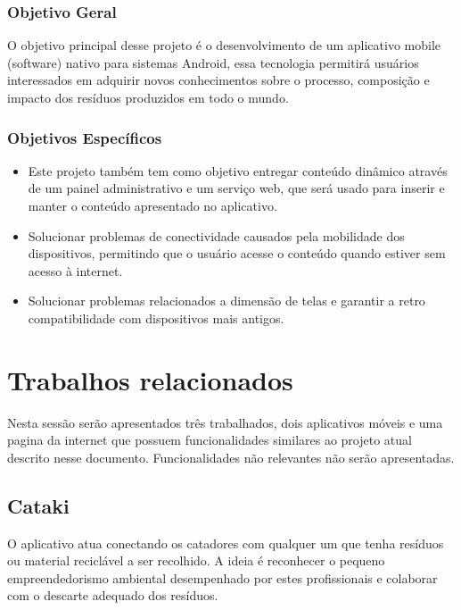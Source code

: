 \documentclass[
	12pt,				%
	openright,			%
	twoside,			%
	a4paper,			%
	english,			%
	french,				%
	spanish,			%
	brazil				%
	]{abntex2}
\begin{document}
\subsection{Objetivo Geral}
O objetivo principal desse projeto é o desenvolvimento de um aplicativo mobile (software) nativo para sistemas Android, essa tecnologia permitirá usuários interessados em adquirir novos conhecimentos sobre o processo, composição e impacto dos resíduos produzidos em todo o mundo.

\subsection{Objetivos Específicos}
\begin{itemize}
	\item Este projeto também tem como objetivo entregar conteúdo dinâmico através de um painel administrativo e um serviço web, que será usado para inserir e manter o conteúdo apresentado no aplicativo.
    \item Solucionar problemas de conectividade causados pela mobilidade dos dispositivos, permitindo que o usuário acesse o conteúdo quando estiver sem acesso à internet.
        \item Solucionar problemas relacionados a dimensão de telas e garantir a retro compatibilidade com dispositivos mais antigos.
\end{itemize}

\chapter{Trabalhos relacionados}

Nesta sessão serão apresentados três trabalhados, dois aplicativos móveis e uma pagina da internet que possuem funcionalidades similares ao projeto atual descrito nesse documento. Funcionalidades não relevantes não serão apresentadas.

\section{Cataki}
O aplicativo atua conectando os catadores com qualquer um que tenha resíduos ou material reciclável a ser recolhido. A ideia é reconhecer o pequeno empreendedorismo ambiental desempenhado por estes profissionais e colaborar com o descarte adequado dos resíduos.
\end{document}
